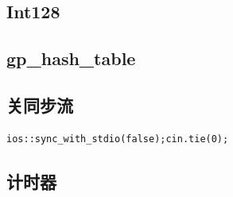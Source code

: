 \documentclass[twocolumn,a4paper]{article}  %
\begin{document}
\subsection{Int128}

\subsection{gp\_hash\_table}

\subsection{关同步流}
\begin{lstlisting}
ios::sync_with_stdio(false);cin.tie(0);
\end{lstlisting}
\subsection{计时器}

\end{document}
